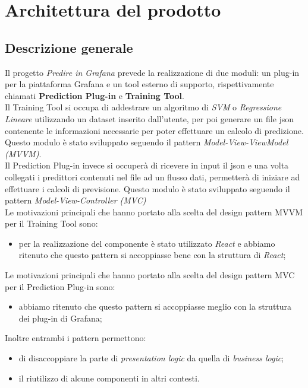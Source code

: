 \section{Architettura del prodotto}

\subsection{Descrizione generale}
Il progetto \textit{Predire in Grafana} prevede la realizzazione di due moduli: un plug-in per la piattaforma Grafana e un tool esterno di supporto, rispettivamente chiamati \textbf{Prediction Plug-in} e \textbf{Training Tool}. \\
Il Training Tool si occupa di addestrare un algoritmo di \textit{SVM} o \textit{Regressione Lineare} utilizzando un dataset inserito dall'utente, per poi generare un file json contenente le informazioni necessarie per poter effettuare un calcolo di predizione. Questo modulo è stato sviluppato seguendo il pattern \textit{Model-View-ViewModel (MVVM)}.\\
Il Prediction Plug-in invece si occuperà di ricevere in input il json e una volta collegati i predittori contenuti nel file ad un flusso dati, permetterà di iniziare ad effettuare i calcoli di previsione. Questo modulo è stato sviluppato seguendo il pattern \textit{Model-View-Controller (MVC)}\\
Le motivazioni principali che hanno portato alla scelta del design pattern MVVM per il Training Tool sono:
\begin{itemize}
	\item per la realizzazione del componente è stato utilizzato \textit{React} e abbiamo ritenuto che questo pattern si accoppiasse bene con la struttura di \textit{React};
\end{itemize}
Le motivazioni principali che hanno portato alla scelta del design pattern MVC per il Prediction Plug-in sono:
\begin{itemize}
	\item abbiamo ritenuto che questo pattern si accoppiasse meglio con la struttura dei plug-in di Grafana;
\end{itemize}
Inoltre entrambi i pattern permettono:
\begin{itemize}
	\item di disaccoppiare la parte di \textit{presentation logic} da quella di
\textit{business logic};
	\item il riutilizzo di alcune componenti in altri contesti.
\end{itemize}


